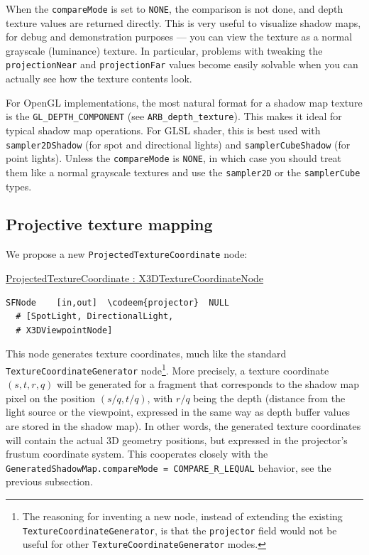 \documentclass{acmsiggraph}                     %
\newenvironment{mycode}
{\begin{mycodecore}}
{\end{mycodecore}
\vspace{-0.1in}}
\newcommand*{\codeem}[1]{\textbf{#1}}
\begin{document}
When the \texttt{compareMode} is set to \texttt{NONE},
the comparison is not done, and depth texture values are returned directly.
This is very useful to visualize shadow maps, for debug and demonstration
purposes --- you can view the texture as a normal grayscale (luminance) texture.
In particular, problems with tweaking the \texttt{projectionNear} and
\texttt{projectionFar} values become easily solvable when you can actually
see how the texture contents look.

\needspace{1in}
For OpenGL implementations, the most natural format for a shadow map texture
is the \texttt{GL\_DEPTH\_COMPONENT} (see \texttt{ARB\_depth\_texture}).
This makes it ideal for typical shadow map operations.
For GLSL shader, this is best used with \texttt{sampler2DShadow}
(for spot and directional lights) and
\texttt{samplerCubeShadow} (for point lights).
Unless the \texttt{compareMode} is \texttt{NONE}, in which case
you should treat them like a normal grayscale textures
and use the \texttt{sampler2D} or the \texttt{samplerCube} types.

\subsection{Projective texture mapping}

We propose a new \texttt{ProjectedTextureCoordinate} node:

\begin{mycode}
\underline{ProjectedTextureCoordinate : X3DTextureCoordinateNode}
\begin{Verbatim}[commandchars=\\\{\}]
SFNode    [in,out]  \codeem{projector}  NULL
  # [SpotLight, DirectionalLight,
  # X3DViewpointNode]
\end{Verbatim}
\end{mycode}

This node generates texture coordinates, much like the standard
\texttt{TextureCoordinateGenerator} node\footnote{The reasoning
for inventing a new node, instead of extending the existing
\texttt{TextureCoordinateGenerator}, is that the \texttt{projector}
field would not be useful for other \texttt{TextureCoordinateGenerator} modes.}.
More precisely, a texture coordinate $(s, t, r, q)$ will be generated for a fragment
that corresponds to the shadow map pixel on the position $(s/q, t/q)$,
with $r/q$ being the depth (distance from the light source or the viewpoint,
expressed in the same way as depth buffer values are stored in the shadow map).
In other words, the generated texture coordinates will contain the actual
3D geometry positions, but expressed in the projector's frustum coordinate system.
This cooperates closely with the \texttt{GeneratedShadowMap.compareMode = COMPARE\_R\_LEQUAL} behavior,
see the previous subsection.
\end{document}
